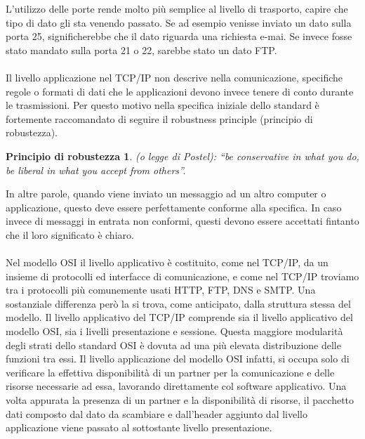 \documentclass{report}%
\theoremstyle{plain}
\begin{document}
L'utilizzo delle porte rende molto più semplice al livello di trasporto, capire che tipo di dato gli sta venendo passato. Se ad esempio venisse inviato un dato sulla porta 25, significherebbe che il dato riguarda una richiesta e-mai. Se invece fosse stato mandato sulla porta 21 o 22, sarebbe stato un dato FTP.\\\\ 
Il livello applicazione nel TCP/IP non descrive nella comunicazione, specifiche regole o formati di dati che le applicazioni devono invece tenere di conto durante le trasmissioni. Per questo motivo nella specifica iniziale dello standard è fortemente raccomandato di seguire il robustness principle (principio di robustezza). \\

\newtheorem*{theorem*}{Principio di robustezza}
\begin{theorem*}
(o legge di Postel): “be conservative in what you do, be liberal in what you accept from others”.
 \end{theorem*} 
 In altre parole, quando viene inviato un messaggio 			ad un altro computer o applicazione, questo deve essere perfettamente conforme alla specifica. In caso invece di messaggi in entrata non conformi, questi devono essere accettati fintanto che il loro significato è chiaro.\\\\
Nel modello OSI il livello applicativo è costituito, come nel TCP/IP, da un insieme di protocolli ed interfacce di comunicazione, e come  nel 	TCP/IP troviamo tra i protocolli più comunemente usati HTTP, FTP, DNS e SMTP. Una sostanziale differenza però la si trova, come anticipato, dalla struttura stessa del modello. Il livello applicativo del TCP/IP comprende sia il livello applicativo del modello OSI, sia i livelli presentazione e sessione. Questa maggiore modularità degli strati dello standard OSI è dovuta ad una più elevata distribuzione delle funzioni tra essi. Il livello applicazione del modello OSI infatti, si occupa solo di verificare la effettiva disponibilità di un partner per la comunicazione e delle risorse necessarie ad essa, lavorando direttamente col software applicativo. Una volta appurata la presenza di un partner e la disponibilità di risorse, il pacchetto dati composto dal dato da scambiare e dall'header aggiunto dal livello applicazione viene passato al sottostante livello presentazione.
\end{document}
